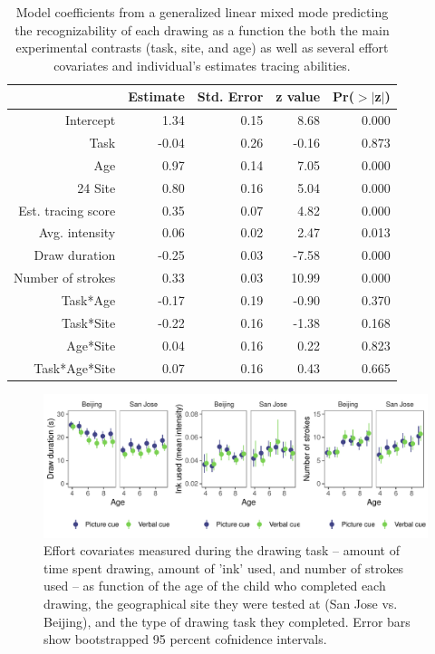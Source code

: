 \documentclass[
  man]{apa6}
\begin{document}
\begin{table}[ht]
\centering
\begin{tabular}{rrrrr}
  \hline
 & Estimate & Std. Error & z value & Pr($>$$|$z$|$) \\ 
  \hline
Intercept & 1.34 & 0.15 & 8.68 & 0.000 \\ 
  Task & -0.04 & 0.26 & -0.16 & 0.873 \\ 
  Age & 0.97 & 0.14 & 7.05 & 0.000 \\ 24
  Site & 0.80 & 0.16 & 5.04 & 0.000 \\ 
  Est. tracing score & 0.35 & 0.07 & 4.82 & 0.000 \\ 
  Avg. intensity & 0.06 & 0.02 & 2.47 & 0.013 \\ 
  Draw duration & -0.25 & 0.03 & -7.58 & 0.000 \\ 
  Number of strokes & 0.33 & 0.03 & 10.99 & 0.000 \\ 
  Task*Age & -0.17 & 0.19 & -0.90 & 0.370 \\ 
  Task*Site & -0.22 & 0.16 & -1.38 & 0.168 \\ 
  Age*Site & 0.04 & 0.16 & 0.22 & 0.823 \\ 
  Task*Age*Site & 0.07 & 0.16 & 0.43 & 0.665 \\ 
   \hline
\end{tabular}
\caption{Model coefficients from a generalized linear mixed mode predicting the recognizability of each drawing as a function the both the main experimental contrasts (task, site, and age) as well as several effort covariates and individual's estimates tracing abilities.} 
\end{table}

\begin{figure}[H]

{\centering \includegraphics[width=\textwidth]{figs/effort-covariates-1} 

}

\caption{Effort covariates measured during the drawing task -- amount of time spent drawing, amount of 'ink' used, and number of strokes used -- as function of the age of the child who completed each drawing, the geographical site they were tested at (San Jose vs. Beijing), and the type of drawing task they completed. Error bars show bootstrapped 95 percent cofnidence intervals.}\label{fig:effort-covariates}
\end{figure}
\end{document}

